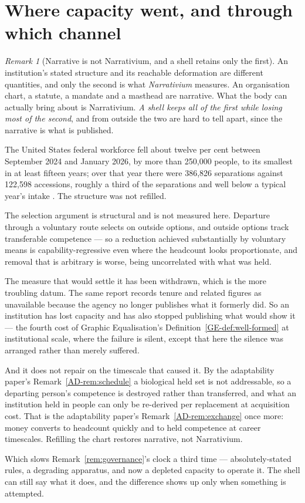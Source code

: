 \documentclass[11pt,a4paper]{article}
\theoremstyle{remark}
\newtheorem{remark}[definition]{Remark}
\begin{document}
\section{Where capacity went, and through which channel}\label{sec:channels}
\begin{remark}[Narrative is not Narrativium, and a shell retains only the first]\label{rem:narrative}
An institution's stated structure and its reachable deformation are different quantities, and only
the second is what \emph{Narrativium} measures. An organisation chart, a statute, a mandate and a masthead
are narrative. What the body can actually bring about is Narrativium. \emph{A shell keeps all of the
first while losing most of the second}, and from outside the two are hard to tell apart, since the
narrative is what is published.

The United States federal workforce fell about twelve per cent between September 2024 and January 2026,
by more than 250,000 people, to its smallest in at least fifteen years; over that year there were
386,826 separations against 122,598 accessions, roughly a third of the separations and well below a
typical year's intake \citep{pps2026}. The structure was not refilled.

The selection argument is structural and is not measured here. Departure through a voluntary route
selects on outside options, and outside options track transferable competence --- so a reduction
achieved substantially by voluntary means is capability-regressive even where the headcount looks
proportionate, and removal that is arbitrary is worse, being uncorrelated with what was held.

The measure that would settle it has been withdrawn, which is the more troubling datum. The same
report records tenure and related figures as unavailable because the agency no longer publishes what it
formerly did. So an institution has lost capacity and has also stopped publishing what would show
it --- the fourth cost of Graphic Equalisation's Definition~\ref{GE-def:well-formed} at institutional
scale, where the failure is silent,
except that here the silence was arranged rather than merely suffered.

And it does not repair on the timescale that caused it. By the adaptability paper's Remark~\ref{AD-rem:schedule} a biological
held set is not addressable, so a departing person's competence is destroyed rather than transferred,
and what an institution held in people can only be re-derived per replacement at acquisition cost. That
is the adaptability paper's Remark~\ref{AD-rem:exchange} once more: money converts to headcount quickly and to held competence at
career timescales. Refilling the chart restores narrative, not Narrativium.

Which slows Remark~\ref{rem:governance}'s clock a third time --- absolutely-stated rules, a degrading
apparatus, and now a depleted capacity to operate it. The shell can still say what it does, and
the difference shows up only when something is attempted.
\end{remark}
\end{document}
